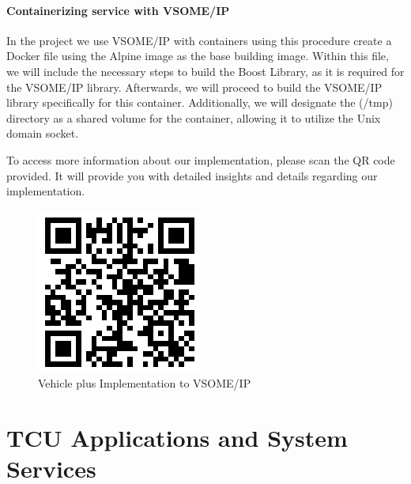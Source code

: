 \documentclass[
12pt,
oneside, 
onehalfspacing, 
nolistspacing, 
parskip, 
chapterinoneline, 
]{AASTCOMPUTER}
\begin{document}
\subsubsection{Containerizing service with VSOME/IP}

In the project we use VSOME/IP with containers using this procedure create a Docker file using the Alpine image as the base building image. Within this file, we will include the necessary steps to build the Boost Library, as it is required for the VSOME/IP library. Afterwards, we will proceed to build the VSOME/IP library specifically for this container. Additionally, we will designate the (/tmp) directory as a shared volume for the container, allowing it to utilize the Unix domain socket.

To access more information about our implementation, please scan the QR code provided. It will provide you with detailed insights and details regarding our implementation.

\begin{figure}[!ht]
\centering
\includegraphics[scale=1]{Figures/Vehicle_Plus_VsomeIp_repo.png}
\caption[Vehicle plus Implementation to VSOME/IP]{Vehicle plus Implementation to VSOME/IP}
\label{fig:SOME/IP On-wire format}
\end{figure}


\chapter{TCU Applications and System Services}
\end{document}
